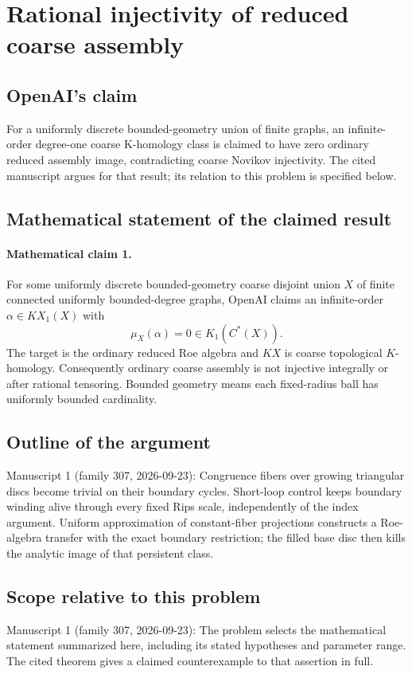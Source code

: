 \documentclass[11pt]{article}
\begin{document}
\section*{Rational injectivity of reduced coarse assembly}

\subsection{OpenAI's claim}
For a uniformly discrete bounded-geometry union of finite graphs, an infinite-order degree-one coarse K-homology class is claimed to have zero ordinary reduced assembly image, contradicting coarse Novikov injectivity. The cited manuscript argues for that result; its relation to this problem is specified below.

\subsection{Mathematical statement of the claimed result}
\paragraph{Mathematical claim 1.} For some uniformly discrete bounded-geometry coarse disjoint union $X$ of finite connected uniformly bounded-degree graphs, OpenAI claims an infinite-order $\alpha\in KX_1(X)$ with
\[
\mu_X(\alpha)=0\in K_1(C^*(X)).
\]
The target is the ordinary reduced Roe algebra and $KX$ is coarse topological $K$-homology. Consequently ordinary coarse assembly is not injective integrally or after rational tensoring. Bounded geometry means each fixed-radius ball has uniformly bounded cardinality.

\subsection{Outline of the argument}
Manuscript 1 (family 307, 2026-09-23): Congruence fibers over growing triangular discs become trivial on their boundary cycles. Short-loop control keeps boundary winding alive through every fixed Rips scale, independently of the index argument. Uniform approximation of constant-fiber projections constructs a Roe-algebra transfer with the exact boundary restriction; the filled base disc then kills the analytic image of that persistent class.

\subsection{Scope relative to this problem}
Manuscript 1 (family 307, 2026-09-23): The problem selects the mathematical statement summarized here, including its stated hypotheses and parameter range. The cited theorem gives a claimed counterexample to that assertion in full.
\end{document}
